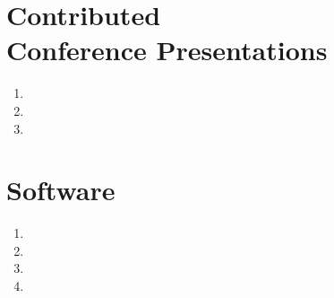 \documentclass[margin,centered]{res}
\newenvironment{list1}{
  \begin{list}{\ding{113}}{%
      \setlength{\itemsep}{0in}
      \setlength{\parsep}{0in} \setlength{\parskip}{0in}
      \setlength{\topsep}{0in} \setlength{\partopsep}{0in}
      \setlength{\leftmargin}{0.17in}}}{\end{list}}
\newenvironment{list2}{
  \begin{list}{$\bullet$}{%
      \setlength{\itemsep}{0in}
      \setlength{\parsep}{0in} \setlength{\parskip}{0in}
      \setlength{\topsep}{0in} \setlength{\partopsep}{0in}
      \setlength{\leftmargin}{0.2in}}}{\end{list}}
\begin{document}
\begin{resume}
\section{\sc Contributed \\ Conference Presentations}
\begin{enumerate}[leftmargin=*]
\item {}
\item {}
\item {}
\end{enumerate}



\section{\sc Software} 
\begin{enumerate}[leftmargin=*]
\item {}
\item {}
\item {}
\item {}
\end{enumerate}



\begin{comment}
{\bf Institute for Mathematics and Its Applications}, Minneapolis, Minnesota
\begin{list1}
\item[] 
Research Assistant, May 2014--July 2014
\begin{list2}
\vspace*{.05in}
\item
 Developed a model to automatically predict mode of transportation using smartphone sensor data
 \item Manipulated, cleaned, and visualized large time-series data sets in R
\item Contributed random forest methods of final model to Android smartphone application
 \item Presented research findings biweekly, created research poster and paper
\end{list2} 
\end{list1}



\end{comment}
\end{resume}
\end{document}
